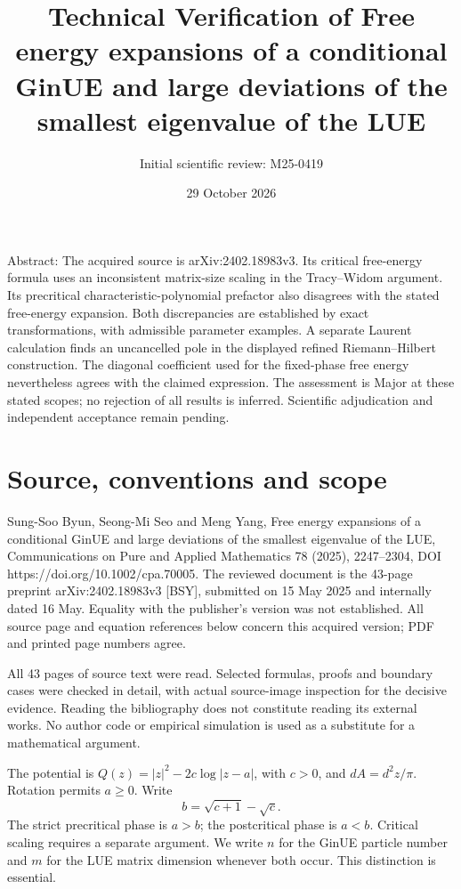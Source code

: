 \documentclass[10pt]{article}
\title{Technical Verification of
Free energy expansions of a conditional GinUE and large deviations of the smallest eigenvalue of the LUE}
\author{Initial scientific review: M25-0419}
\date{29 October 2026}
\begin{document}
\maketitle
Abstract: The acquired source is arXiv:2402.18983v3. Its critical free-energy formula uses an inconsistent matrix-size scaling in the Tracy–Widom argument. Its precritical characteristic-polynomial prefactor also disagrees with the stated free-energy expansion. Both discrepancies are established by exact transformations, with admissible parameter examples. A separate Laurent calculation finds an uncancelled pole in the displayed refined Riemann–Hilbert construction. The diagonal coefficient used for the fixed-phase free energy nevertheless agrees with the claimed expression. The assessment is Major at these stated scopes; no rejection of all results is inferred. Scientific adjudication and independent acceptance remain pending.\par
\section*{Source, conventions and scope}
Sung-Soo Byun, Seong-Mi Seo and Meng Yang, Free energy expansions of a conditional GinUE and large deviations of the smallest eigenvalue of the LUE, Communications on Pure and Applied Mathematics 78 (2025), 2247–2304, DOI https://doi.org/10.1002/cpa.70005. The reviewed document is the 43-page preprint arXiv:2402.18983v3 [BSY], submitted on 15 May 2025 and internally dated 16 May. Equality with the publisher’s version was not established. All source page and equation references below concern this acquired version; PDF and printed page numbers agree.\par
All 43 pages of source text were read. Selected formulas, proofs and boundary cases were checked in detail, with actual source-image inspection for the decisive evidence. Reading the bibliography does not constitute reading its external works. No author code or empirical simulation is used as a substitute for a mathematical argument.\par
The potential is \(Q(z)=|z|^2-2c\log|z-a|\), with \(c>0\), and \(dA=d^2z/\pi\). Rotation permits \(a\geq0\). Write \[b=\sqrt{c+1}-\sqrt c.\] The strict precritical phase is \(a>b\); the postcritical phase is \(a<b\). Critical scaling requires a separate argument. We write \(n\) for the GinUE particle number and \(m\) for the LUE matrix dimension whenever both occur. This distinction is essential.\par
\end{document}
